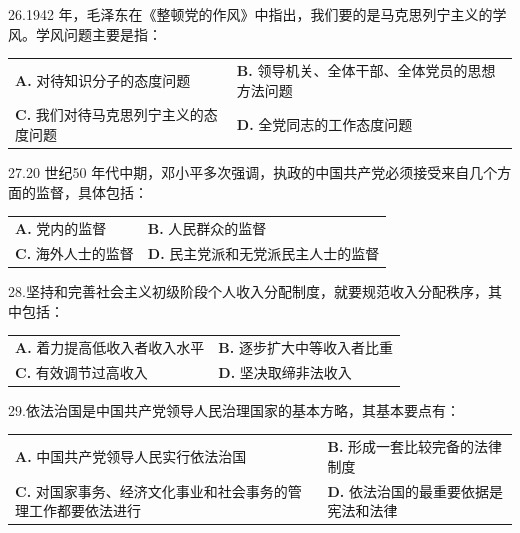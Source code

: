 \documentclass[UTF8,11pt]{ctexart}
\begin{document}
26.1942 年，毛泽东在《整顿党的作风》中指出，我们要的是马克思列宁主义的学风。学风问题主要是指：


\begin{center}\begin{tabular}{>{\raggedright\arraybackslash}p{\dimexpr(\linewidth-4\tabcolsep)/2\relax}>{\raggedright\arraybackslash}p{\dimexpr(\linewidth-4\tabcolsep)/2\relax}}
\textbf{A.} 对待知识分子的态度问题 & \textbf{B.} 领导机关、全体干部、全体党员的思想方法问题\\[.35em]
\textbf{C.} 我们对待马克思列宁主义的态度问题 & \textbf{D.} 全党同志的工作态度问题\\[.35em]\end{tabular}\end{center}

27.20 世纪50 年代中期，邓小平多次强调，执政的中国共产党必须接受来自几个方面的监督，具体包括：


\begin{center}\begin{tabular}{>{\raggedright\arraybackslash}p{\dimexpr(\linewidth-4\tabcolsep)/2\relax}>{\raggedright\arraybackslash}p{\dimexpr(\linewidth-4\tabcolsep)/2\relax}}
\textbf{A.} 党内的监督 & \textbf{B.} 人民群众的监督\\[.35em]
\textbf{C.} 海外人士的监督 & \textbf{D.} 民主党派和无党派民主人士的监督\\[.35em]\end{tabular}\end{center}

28.坚持和完善社会主义初级阶段个人收入分配制度，就要规范收入分配秩序，其中包括：


\begin{center}\begin{tabular}{>{\raggedright\arraybackslash}p{\dimexpr(\linewidth-4\tabcolsep)/2\relax}>{\raggedright\arraybackslash}p{\dimexpr(\linewidth-4\tabcolsep)/2\relax}}
\textbf{A.} 着力提高低收入者收入水平 & \textbf{B.} 逐步扩大中等收入者比重\\[.35em]
\textbf{C.} 有效调节过高收入 & \textbf{D.} 坚决取缔非法收入\\[.35em]\end{tabular}\end{center}

29.依法治国是中国共产党领导人民治理国家的基本方略，其基本要点有：


\begin{center}\begin{tabular}{>{\raggedright\arraybackslash}p{\dimexpr(\linewidth-4\tabcolsep)/2\relax}>{\raggedright\arraybackslash}p{\dimexpr(\linewidth-4\tabcolsep)/2\relax}}
\textbf{A.} 中国共产党领导人民实行依法治国 & \textbf{B.} 形成一套比较完备的法律制度\\[.35em]
\textbf{C.} 对国家事务、经济文化事业和社会事务的管理工作都要依法进行 & \textbf{D.} 依法治国的最重要依据是宪法和法律\\[.35em]\end{tabular}\end{center}
\end{document}
